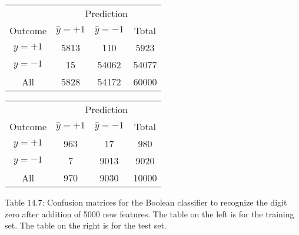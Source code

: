 \begin{table}
\begin{tabular}{c c c c} \hline \hline  & \multicolumn{3}{c}{Prediction} \\ \cline{2-4} Outcome & \(\hat{y}=+1\) & \(\hat{y}=-1\) & Total \\ \hline \(y=+1\) & 5813 & 110 & 5923 \\ \(y=-1\) & 15 & 54062 & 54077 \\ All & 5828 & 54172 & 60000 \\ \hline \hline \end{tabular} 
\begin{tabular}{c c c c} \hline \hline  & \multicolumn{3}{c}{Prediction} \\ \cline{2-4} Outcome & \(\hat{y}=+1\) & \(\hat{y}=-1\) & Total \\ \hline \(y=+1\) & 963 & 17 & 980 \\ \(y=-1\) & 7 & 9013 & 9020 \\ All & 970 & 9030 & 10000 \\ \hline \hline \end{tabular}
\end{table}
Table 14.7: Confusion matrices for the Boolean classifier to recognize the digit zero after addition of 5000 new features. The table on the left is for the training set. The table on the right is for the test set.

 